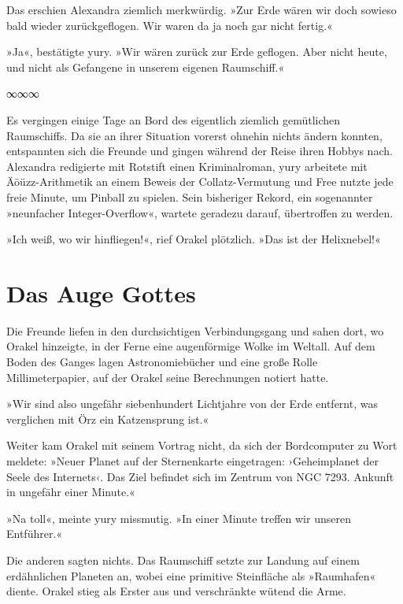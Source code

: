 Das erschien Alexandra ziemlich merkwürdig. »Zur Erde wären wir doch sowieso bald wieder zurückgeflogen. Wir waren da ja noch gar nicht fertig.«

»Ja«, bestätigte yury. »Wir wären zurück zur Erde geflogen. Aber nicht heute, und nicht als Gefangene in unserem eigenen Raumschiff.«

\begin{center}
    ∞∞∞
\end{center}

Es vergingen einige Tage an Bord des eigentlich ziemlich gemütlichen Raumschiffs. Da sie an ihrer Situation vorerst ohnehin nichts ändern konnten, entspannten sich die Freunde und gingen während der Reise ihren Hobbys nach. Alexandra redigierte mit Rotstift einen Kriminalroman, yury arbeitete mit Äöüzz-Arithmetik an einem Beweis der Collatz-Vermutung und Free nutzte jede freie Minute, um Pinball zu spielen. Sein bisheriger Rekord, ein sogenannter »neunfacher Integer-Overflow«, wartete geradezu darauf, übertroffen zu werden.

»Ich weiß, wo wir hinfliegen!«, rief Orakel plötzlich. »Das ist der Helixnebel!«

\cleardoubleevenpage



\chapter{Das Auge Gottes}

Die Freunde liefen in den durchsichtigen Verbindungsgang und sahen dort, wo Orakel hinzeigte, in der Ferne eine augenförmige Wolke im Weltall. Auf dem Boden des Ganges lagen Astronomiebücher und eine große Rolle Millimeterpapier, auf der Orakel seine Berechnungen notiert hatte.

»Wir sind also ungefähr siebenhundert Lichtjahre von der Erde entfernt, was verglichen mit Örz ein Katzensprung ist.«

Weiter kam Orakel mit seinem Vortrag nicht, da sich der Bordcomputer zu Wort meldete: »Neuer Planet auf der Sternenkarte eingetragen: ›Geheimplanet der Seele des Internets‹. Das Ziel befindet sich im Zentrum von NGC 7293. Ankunft in ungefähr einer Minute.«

»Na toll«, meinte yury missmutig. »In einer Minute treffen wir unseren Entführer.«

Die anderen sagten nichts. Das Raumschiff setzte zur Landung auf einem erdähnlichen Planeten an, wobei eine primitive Steinfläche als »Raumhafen« diente. Orakel stieg als Erster aus und verschränkte wütend die Arme.

